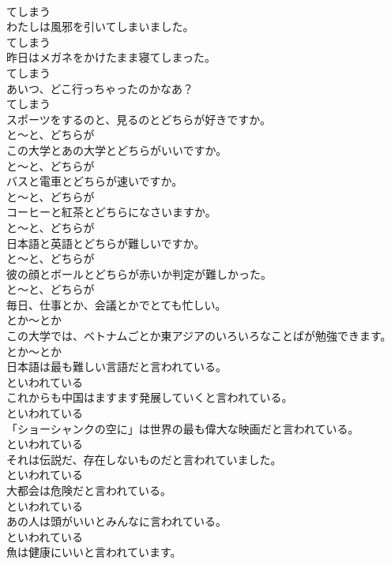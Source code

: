 \documentclass[8pt]{extreport}
\begin{document}
\begin{CJK}{UTF8}{min}
\\	てしまう
\\	わたしは風邪を引いてしまいました。	
\\	てしまう
\\	昨日はメガネをかけたまま寝てしまった。	
\\	てしまう
\\	あいつ、どこ行っちゃったのかなあ？	
\\	てしまう
\\	スポーツをするのと、見るのとどちらが好きですか。	
\\	と～と、どちらが
\\	この大学とあの大学とどちらがいいですか。	
\\	と～と、どちらが
\\	バスと電車とどちらが速いですか。	
\\	と～と、どちらが
\\	コーヒーと紅茶とどちらになさいますか。	
\\	と～と、どちらが
\\	日本語と英語とどちらが難しいですか。	
\\	と～と、どちらが
\\	彼の顔とボールとどちらが赤いか判定が難しかった。	
\\	と～と、どちらが
\\	毎日、仕事とか、会議とかでとても忙しい。	
\\	とか～とか
\\	この大学では、ベトナムごとか東アジアのいろいろなことばが勉強できます。	
\\	とか～とか
\\	日本語は最も難しい言語だと言われている。	
\\	といわれている
\\	これからも中国はますます発展していくと言われている。	
\\	といわれている
\\	「ショーシャンクの空に」は世界の最も偉大な映画だと言われている。	
\\	といわれている
\\	それは伝説だ、存在しないものだと言われていました。	
\\	といわれている
\\	大都会は危険だと言われている。	
\\	といわれている
\\	あの人は頭がいいとみんなに言われている。	
\\	といわれている
\\	魚は健康にいいと言われています。	

\end{CJK}
\end{document}
